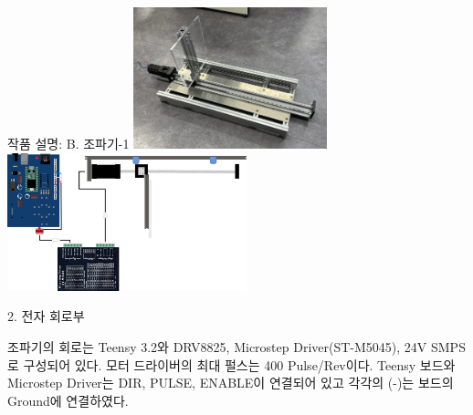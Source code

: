 \documentclass[Junlampaper, portrait]{Junlam_PosterK}
\begin{document}
\begin{poster}
\begin{posterbox}[name=circuit, column=0, below=theo]{작품 설명: B. 조파기-1}
            \includegraphics[width=0.42\textwidth]{images/jopagi.jpg} 
            \includegraphics[width=0.52\textwidth]{images/wavemaker_control.png}
        \label{circuit}   

\small {2. 전자 회로부\\}
    \scriptsize {
    
    조파기의 회로는 Teensy 3.2와 DRV8825, Microstep Driver(ST-M5045), 24V SMPS로 구성되어 있다. 모터 드라이버의 최대 펄스는 400 Pulse/Rev이다. Teensy 보드와 Microstep Driver는 DIR, PULSE, ENABLE이 연결되어 있고 각각의 (-)는 보드의 Ground에 연결하였다.}
    

\end{posterbox}
\end{poster}
\end{document}
